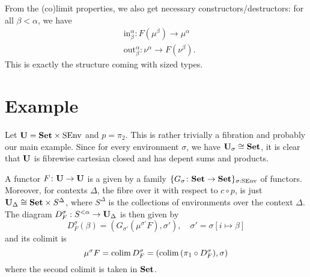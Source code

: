 \documentclass[runningheads,envcountsame,envcountsect,orivec]{llncs}
\begin{document}
From the (co)limit properties, we also get necessary constructors/destructors:
for all $\beta < \alpha$, we have
\begin{align*}
  & \mathrm{in}^{\alpha}_{\beta} : F\left(\mu^{\beta}\right) \to \mu^{\alpha} \\
  & \mathrm{out}^{\alpha}_{\beta} : \nu^{\alpha} \to F\left(\nu^{\beta}\right).
\end{align*}
This is exactly the structure coming with sized types.


\section{Example}
Let $\mathbf{U} = \mathbf{Set} \times \mathrm{SEnv}$ and $p = \pi_2$.
This is rather trivially a fibration and probably our main example.
Since for every environment $\sigma$, we have $\mathbf{U}_\sigma \cong \mathbf{Set}$, it
is clear that $\mathbf{U}$ is fibrewise cartesian closed and has depent sums and
products.

A functor $F \colon \mathbf{U} \rightarrow \mathbf{U}$ is a given by a family
$\{G_\sigma \colon \mathbf{Set} \rightarrow \mathbf{Set}\}_{\sigma : \mathrm{SEnv}}$ of functors.
Moreover, for contexts $\Delta$, the fibre over it with respect to $c \circ p$,
is just $\mathbf{U}_\Delta \cong \mathbf{Set} \times S^\Delta$, where $S^\Delta$ is the
collections of environments over the context $\Delta$.
The diagram $D^\sigma_F : S^{< \alpha} \to \mathbf{U}_\Delta$ is then given by
\begin{equation*}
  D^\sigma_F(\beta) = (G_{\sigma'}(\mu^{\sigma'}F), \sigma'),
  \quad \sigma' = \sigma[i \mapsto \beta]
\end{equation*}
and its colimit is
\begin{equation*}
  \mu^{\sigma}F = \operatorname*{colim} D^\sigma_F
  = (\operatorname*{colim} \, (\pi_1 \circ D^{\sigma}_F), \sigma)
\end{equation*}
where the second colimit is taken in $\mathbf{Set}$.
\end{document}
